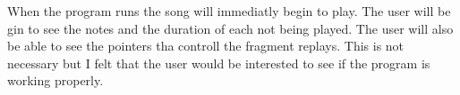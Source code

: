 When the program runs the song will immediatly begin to play. The user will be gin to see the notes and the duration of each not being played. The user will also be able to see the pointers tha controll the fragment replays. This is not necessary but I felt that the user would be interested to see if the program is working properly. 